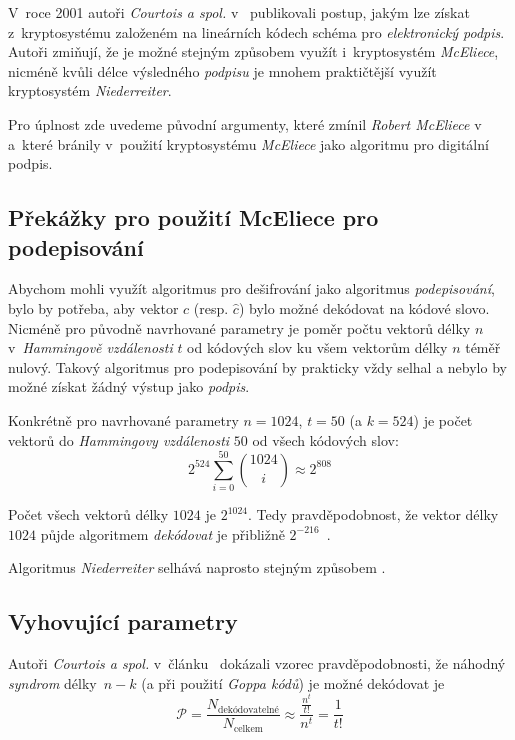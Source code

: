 \documentclass[thesis=M,czech,hidelinks]{FITthesis}[2012/06/26]
\newcommand{\0}{{\textcolor[gray]{0.75}{0}}}
\begin{document}
V~roce 2001 autoři \emph{Courtois a spol.} v~\cite{Courtois} publikovali postup,
jakým lze získat z~kryptosystému založeném na lineárních kódech schéma pro
\emph{elektronický podpis}. Autoři zmiňují, že je možné stejným způsobem využít
i~kryptosystém \emph{McEliece}, nicméně kvůli délce výsledného \emph{podpisu} je
mnohem praktičtější využít kryptosystém \emph{Niederreiter}.


Pro úplnost zde uvedeme původní argumenty, které zmínil \emph{Robert
McEliece} v~\cite{McEliece} a~které bránily v~použití kryptosystému
\emph{McEliece} jako algoritmu pro digitální podpis.


\subsection{Překážky pro použití McEliece pro podepisování}

Abychom mohli využít algoritmus pro dešifrování jako algoritmus
\emph{podepisování}, bylo by potřeba, aby vektor $c$ (resp. $\hat{c}$) bylo
možné dekódovat na kódové slovo. Nicméně pro původně navrhované parametry je
poměr počtu vektorů délky $n$ v~\emph{Hammingově vzdálenosti} $t$ od kódových
slov ku všem vektorům délky $n$ téměř nulový. Takový algoritmus pro podepisování
by prakticky vždy selhal a nebylo by možné získat žádný výstup jako
\emph{podpis}.

Konkrétně pro navrhované parametry $n=1024$, $t=50$ (a $k=524$) je počet vektorů
do \emph{Hammingovy vzdálenosti} $50$ od všech kódových slov:
$$ 2^{524}\sum_{i = 0}^{50}\binom{1024}{i} \approx 2^{808} $$

\newpage

Počet všech vektorů délky $1024$ je $2^{1024}$. Tedy pravděpodobnost, že vektor
délky $1024$ půjde algoritmem \emph{dekódovat} je přibližně
$2^{-216}$~\cite{McEliece}.

Algoritmus \emph{Niederreiter} selhává naprosto stejným způsobem
\cite{Courtois}.


\subsection{Vyhovující parametry}

Autoři \emph{Courtois a spol.} v~článku~\cite{Courtois} dokázali vzorec
pravděpodobnosti, že náhodný \emph{syndrom} délky~$n-k$ (a při použití
\emph{Goppa kódů}) je možné dekódovat je
$$
    \mathcal{P} = \frac{N_{\text{dekódovatelné}}}{N_{\text{celkem}}} \approx
    \frac{\frac{n^t}{t!}}{n^t} = \frac{1}{t!}
$$
\end{document}
